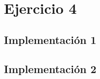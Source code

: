 \documentclass{article}
\begin{document}
    \section*{Ejercicio 4}

    \subsection*{Implementación 1}
    

    \subsection*{Implementación 2}
    
\end{document}
